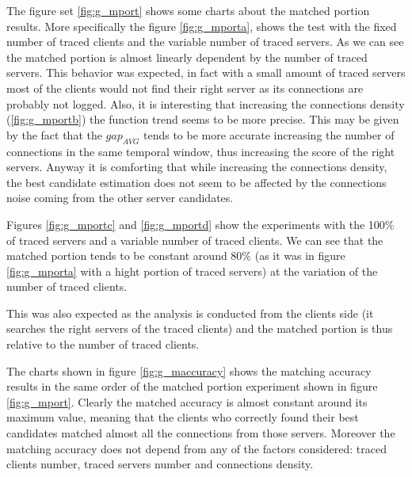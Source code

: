 The figure set \ref{fig:g_mport} shows some charts about the matched
portion results. More specifically the figure \ref{fig:g_mporta}, shows
the test with the fixed number of traced clients and the variable number
of traced servers. As we can see the matched portion is almost linearly 
dependent by the number of traced servers.
This behavior was expected, in fact with a small amount of traced
servers most of the clients would not find their right server as its
connections are probably not logged. Also, it is interesting that
increasing the connections density (\ref{fig:g_mportb}) the function
trend seems to be more precise. This may be given by the fact that the
$gap_{AVG}$ tends to be more accurate increasing the number of
connections in the same temporal window, thus increasing the score of
the right
servers. Anyway it is comforting that while increasing the
connections density, the best candidate estimation does not seem to be affected by the 
 connections noise coming from the other server candidates.

Figures \ref{fig:g_mportc} and \ref{fig:g_mportd} show the experiments
with the 100\% of traced servers and a variable number of
traced clients. We can see
that the matched portion tends to be constant around 80\% (as it was in
figure \ref{fig:g_mporta} with a hight portion of traced servers) at the variation of
the number of traced clients. 

This was also expected as the analysis is
conducted from the clients side (it searches the right servers of the
traced clients) and the matched portion is thus relative to the
number of traced clients. 

The charts shown in figure \ref{fig:g_maccuracy} shows the matching
accuracy results in the same order of the matched portion experiment
shown in figure \ref{fig:g_mport}. Clearly the matched accuracy is
almost constant around its maximum value, meaning that the clients who
correctly found their best candidates matched almost all the connections
from those servers. Moreover the matching accuracy does not
depend from any of the factors considered: traced clients number, traced
servers number and connections density.



